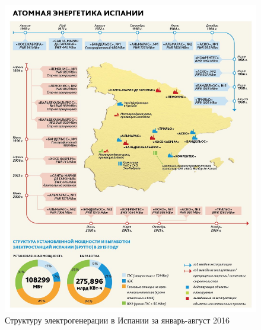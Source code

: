 \begin{figure}[h]
	\begin{center}
		\includegraphics[width=.5\columnwidth]{./img/spain_en_history.jpg}
	\end{center}
	\caption{Структуру электрогенерации в Испании за январь-август 2016}
	\label{pic:struct_energy}
\end{figure}